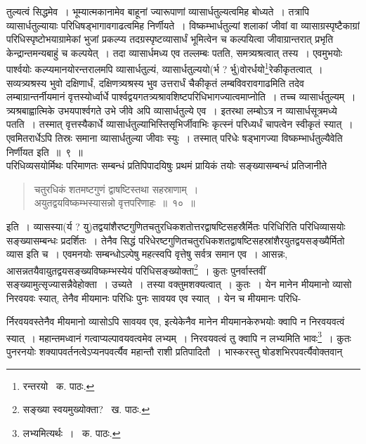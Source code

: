 \documentclass[11pt, openany]{book}
\begin{document}
\noindent तुल्यत्वं सिद्धमेव~। भूम्यात्मकानामेव बाहूनां ज्यारूपाणां व्यासार्धतुल्यत्वमिह बोध्यते~। तत्रापि व्यासार्धतुल्यायाः परिधिषड्भागावगाढत्वमिह निर्णीयते~। विष्कम्भार्धतुल्यां शलाकां जीवां वा व्यासाग्रस्पृष्टैकाग्रां परिधिस्पृष्टोभयाग्रामेकां भुजां प्रकल्प्य तदग्रस्पृष्टव्यासार्धं भूमित्वेन च कल्पयित्वा जीवाग्रान्तरात् प्रभृति केन्द्रान्तमन्यबाहुं च कल्पयेत्~। तदा व्यासार्धमध्य एव तल्लम्बः पतति, समत्र्यश्रत्वात् तस्य~। एवमुभयोः पार्श्वयोः कल्प्यमानयोरन्तरालमपि व्यासार्धतुल्यं, व्यासार्धतुल्ययो(र्भ ? र्भु)वोरर्धयो\renewcommand{\thefootnote}{१}\footnote{रन्तरयो \textendash\ क. पाठः.}रेकीकृतत्वात्~। सव्यत्र्यश्रस्य भुवो दक्षिणार्धं, दक्षिणत्र्यश्रस्य भुव उत्तरार्धं चैकीकृतं लम्बविवरावगाढमिति तदेव लम्बाग्रान्तर्नीयमानं वृत्तस्योर्ध्वार्धे पार्श्वद्वयगतत्र्यश्रावशिष्टपरिधिभागज्यात्वमाप्नोति~। तच्च व्यासार्धतुल्यम्~। त्र्यश्रबाह्वात्मिके उभयपार्श्वगते उभे जीवे अपि व्यासार्धतुल्ये एव~। इतरथा लम्बोऽत्र न व्यासार्धसूत्रमध्ये पतति~। तस्मात् वृत्तस्यैकार्धे व्यासार्धतुल्याभिस्तिसृभिर्जीवाभिः कृत्स्नं परिध्यर्धं चापत्वेन स्वीकृतं स्यात्~। एवमितरार्धेऽपि तिस्रः समाना व्यासार्धतुल्या जीवाः स्युः~। तस्मात् परिधेः षड्भागज्या विष्कम्भार्धतुल्यैवेति निर्णीयत इति~॥~९~॥ \\

परिधिव्यसयोर्मिथः परिमाणतः सम्बन्धं प्रतिपिपादयिषुः प्रथमं प्रायिकं तयोः सङ्ख्यासम्बन्धं प्रतिजानीते\textendash

\begin{quote}
{\ab चतुरधिकं शतमष्टगुणं द्वाषष्टिस्तथा सहस्राणाम्~।\\
अयुतद्वयविष्कम्भस्यासन्नो वृत्तपरिणाहः~॥~१०~॥}
\end{quote}
इति~। व्यासस्या(र्य ? यु)तद्वयांशैरष्टगुणितचतुरधिकशतोत्तरद्वाषष्टिसहस्रैर्मितः परिधिरिति परिधिव्यासयोः सङ्ख्यासम्बन्धः प्रदर्शितः~। तेनैव सिद्धं
परिधेरष्टगुणितचतुरधिकशतद्वाषष्टिसहस्रांशैरयुतद्वयसङ्ख्यैर्मितो व्यास इति च~। एवमनयोः सम्बन्धोऽल्पेषु महत्स्वपि वृत्तेषु सर्वत्र समान एव~। आसन्नः, आसन्नतयैवायुतद्वयसङ्ख्यविष्कम्भस्येयं परिधिसङ्ख्योक्ता\renewcommand{\thefootnote}{२}\footnote{सङ्ख्या स्वयमुख्योक्ता? \textendash\ ख. पाठः.}~। कुतः पुनर्वास्तवीं सङ्ख्यामुत्सृज्यासन्नैवेहोक्ता~। उच्यते~। तस्या
वक्तुमशक्यत्वात्~। कुतः~। येन मानेन मीयमानो व्यासो निरवयवः स्यात्, तेनैव मीयमानः परिधिः पुनः सावयव एव स्यात्~। येन च मीयमानः परिधि-

\newpage

\noindent र्निरवयवस्तेनैव मीयमानो व्यासोऽपि सावयव एव, इत्येकेनैव मानेन मीयमानकेरुभयोः क्वापि न निरवयवत्वं स्यात्~। महान्तमध्वानं गत्वाप्यल्पावयवत्वमेव लभ्यम्~। निरवयवत्वं तु क्वापि न लभ्यमिति भावः\renewcommand{\thefootnote}{१}\footnote{लभ्यमित्यर्थः~। \textendash\ क. पाठः.}~। कुतः पुनरनयोः शक्यापवर्तनत्वेऽप्यनपवर्त्यैव महान्तौ राशी प्रतिपादितौ~। भास्करस्तु षोडशभिरपवर्त्यैवोक्तवान्\textendash 
\end{document}
